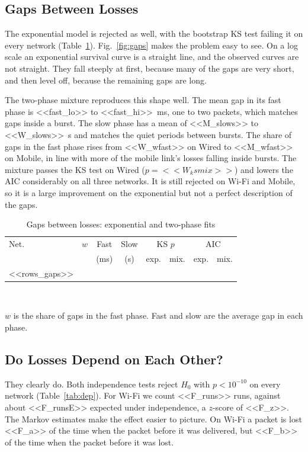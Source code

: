 \documentclass[conference]{IEEEtran}
\begin{document}
\subsection{Gaps Between Losses}
The exponential model is rejected as well, with the bootstrap KS test failing it on every network (Table~\ref{tab:gaps}). Fig.~\ref{fig:gaps} makes the problem easy to see. On a log scale an exponential survival curve is a straight line, and the observed curves are not straight. They fall steeply at first, because many of the gaps are very short, and then level off, because the remaining gaps are long.

The two-phase mixture reproduces this shape well. The mean gap in its fast phase is <<fast_lo>> to <<fast_hi>>~ms, one to two packets, which matches gaps inside a burst. The slow phase has a mean of <<M_slows>> to <<W_slows>>~s and matches the quiet periods between bursts. The share of gaps in the fast phase rises from <<W_wfast>> on Wired to <<M_wfast>> on Mobile, in line with more of the mobile link's losses falling inside bursts. The mixture passes the KS test on Wired ($p=<<W_ksmix>>$) and lowers the AIC considerably on all three networks. It is still rejected on Wi-Fi and Mobile, so it is a large improvement on the exponential but not a perfect description of the gaps.

\begin{table}[!t]
\caption{Gaps between losses: exponential and two-phase fits}
\label{tab:gaps}
\centering
\footnotesize
\setlength{\tabcolsep}{3pt}
\begin{tabular}{lccccccc}
\toprule
Net. & $w$ & Fast & Slow & \multicolumn{2}{c}{KS $p$} & \multicolumn{2}{c}{AIC} \\
 & & (ms) & (s) & exp. & mix. & exp. & mix. \\
\midrule
<<rows_gaps>>
\bottomrule
\end{tabular}
\\[2pt]
\raggedright\scriptsize $w$ is the share of gaps in the fast phase. Fast and slow are the average gap in each phase.
\end{table}

\subsection{Do Losses Depend on Each Other?}
They clearly do. Both independence tests reject $H_0$ with $p<10^{-10}$ on every network (Table~\ref{tab:dep}). For Wi-Fi we count <<F_runs>> runs, against about <<F_runsE>> expected under independence, a $z$-score of <<F_z>>. The Markov estimates make the effect easier to picture. On Wi-Fi a packet is lost <<F_a>> of the time when the packet before it was delivered, but <<F_b>> of the time when the packet before it was lost.
\end{document}
